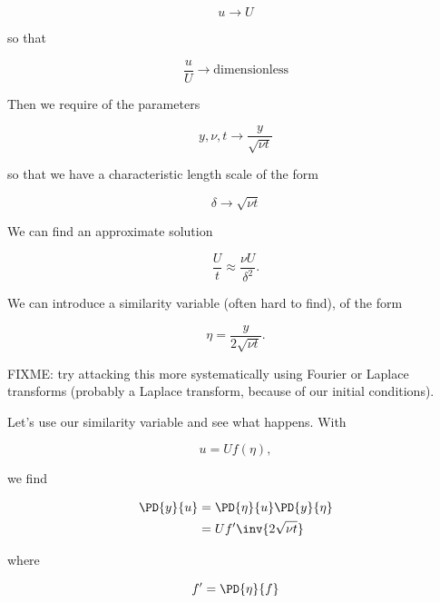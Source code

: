 \begin{equation}\label{eqn:continuumL16:290}
u \rightarrow U
\end{equation}

so that

\begin{equation}\label{eqn:continuumL16:310}
\frac{u}{U} \rightarrow \text{dimensionless}
\end{equation}

Then we require of the parameters

\begin{equation}\label{eqn:continuumL16:330}
y, \nu, t \rightarrow \frac{y}{\sqrt{\nu t}}
\end{equation}

so that we have a characteristic length scale of the form

\begin{equation}\label{eqn:continuumL16:350}
\delta \rightarrow \sqrt{\nu t}
\end{equation}

We can find an approximate solution

\begin{equation}\label{eqn:continuumL16:370}
\frac{U}{t} \approx \frac{\nu U}{\delta^2}.
\end{equation}

We can introduce a similarity variable (often hard to find), of the form

\begin{equation}\label{eqn:continuumL16:390}
\eta = \frac{y}{2 \sqrt{\nu t}}.
\end{equation}

FIXME: try attacking this more systematically using Fourier or Laplace transforms (probably a Laplace transform, because of our initial conditions).

Let's use our similarity variable and see what happens.  With

\begin{equation}\label{eqn:continuumL16:410}
u = U f(\eta),
\end{equation}

we find

\begin{align*}
\PD{y}{u} 
&= \PD{\eta}{u} \PD{y}{\eta} \\
&= U f' \inv{2 \sqrt{\nu t}}
\end{align*}

where 

\begin{equation}\label{eqn:continuumL16:430}
f' = \PD{\eta}{f}
\end{equation}

